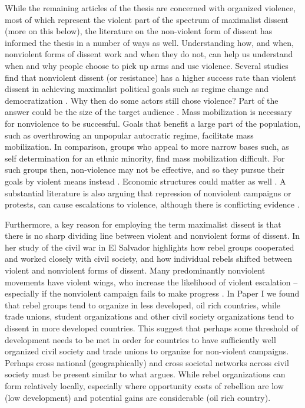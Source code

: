 While the remaining articles of the thesis are concerned with organized
violence, most of which represent the violent part of the spectrum of maximalist
dissent (more on this below), the literature on the non-violent form of dissent
has informed the thesis in a number of ways as well. Understanding how, and
when, nonviolent forms of dissent work and when they do not, can help us
understand when and why people choose to pick up arms and use violence. Several
studies find that nonviolent dissent (or resistance) has a higher success rate
than violent dissent in achieving maximalist political goals
\citep{chenoweth2011civil, Stephan_2008} such as regime change and
democratization \citep{Celestino_2013, Bethke_2019}. Why then do some actors
still chose violence? Part of the answer could be the size of the target
audience \citep{Gleditsch_2021}. Mass mobilization is necessary for nonviolence
to be successful. Goals that benefit a large part of the population, such as
overthrowing an unpopular autocratic regime, facilitate mass mobilization. In
comparison, groups who appeal to more narrow bases such, as self determination
for an ethnic minority, find mass mobilization difficult. For such groups then,
non-violence may not be effective, and so they pursue their goals by violent
means instead \citep{Gleditsch_2021}. Economic structures could matter as well
\citep{Butcher_2014}. A substantial literature is also arguing that repression
of nonviolent campaigns or protests, can cause escalations to violence, although
there is conflicting evidence \citep{Chenoweth_2017, Lichbach_1987}.

Furthermore, a key reason for employing the term maximalist dissent is that
there is no sharp dividing line between violent and nonviolent forms of dissent.
In her study of the civil war in El Salvador \citet{Wood2003} highlights how
rebel groups cooperated and worked closely with civil society, and how
individual rebels shifted between violent and nonviolent forms of dissent. Many
predominantly nonviolent movements have violent wings, who increase the
likelihood of violent escalation -- especially if the nonviolent campaign fails
to make progress \citep{Ryckman_2019}. In Paper I we found that rebel groups
tend to organize in less developed, oil rich countries, while trade unions,
student organizations and other civil society organizations tend to dissent in
more developed countries. This suggest that perhaps some threshold of
development needs to be met in order for countries to have sufficiently well
organized civil society and trade unions to organize for non-violent campaigns.
Perhaps cross national (geographically) and cross societal networks across civil
society must be present similar to what \citet{Wimmer_2018} argues. While rebel
organizations can form relatively locally, especially where opportunity costs of
rebellion are low (low development) and potential gains are considerable (oil
rich country).

